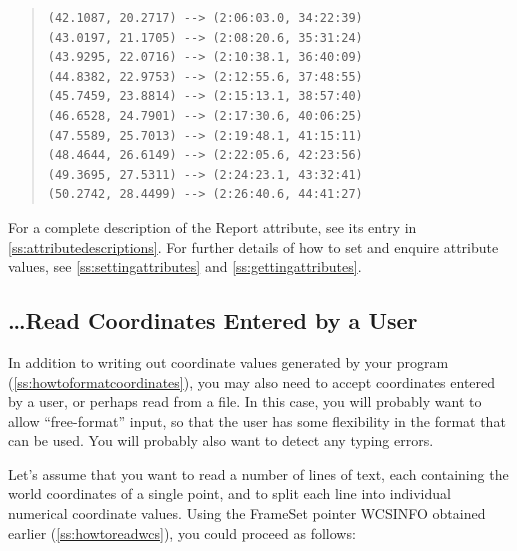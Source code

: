 \documentclass[twoside,11pt]{article}
\newcommand{\htmlref}[2]{#1}
\newcommand{\appref}[1]{Appendix~\ref{#1}}
\newcommand{\secref}[1]{\S\ref{#1}}
\renewcommand{\appref}[1]{\ref{#1}}
\renewcommand{\secref}[1]{\ref{#1}}
\begin{document}
\begin{quote}
\begin{verbatim}
(42.1087, 20.2717) --> (2:06:03.0, 34:22:39)
(43.0197, 21.1705) --> (2:08:20.6, 35:31:24)
(43.9295, 22.0716) --> (2:10:38.1, 36:40:09)
(44.8382, 22.9753) --> (2:12:55.6, 37:48:55)
(45.7459, 23.8814) --> (2:15:13.1, 38:57:40)
(46.6528, 24.7901) --> (2:17:30.6, 40:06:25)
(47.5589, 25.7013) --> (2:19:48.1, 41:15:11)
(48.4644, 26.6149) --> (2:22:05.6, 42:23:56)
(49.3695, 27.5311) --> (2:24:23.1, 43:32:41)
(50.2742, 28.4499) --> (2:26:40.6, 44:41:27)
\end{verbatim}
\end{quote}

For a complete description of the Report attribute, see its entry in
\appref{ss:attributedescriptions}.  For further details of how to set
and enquire attribute values, see \secref{ss:settingattributes} and
\secref{ss:gettingattributes}.

\subsection{\ldots Read Coordinates Entered by a User}

In addition to writing out coordinate values generated by your program
(\secref{ss:howtoformatcoordinates}), you may also need to accept
coordinates entered by a user, or perhaps read from a file. In this
case, you will probably want to allow ``free-format'' input, so that
the user has some flexibility in the format that can be used. You will
probably also want to detect any typing errors.

Let's assume that you want to read a number of lines of text, each
containing the world coordinates of a single point, and to split each
line into individual numerical coordinate values. Using the \htmlref{FrameSet}{FrameSet}
pointer WCSINFO obtained earlier (\secref{ss:howtoreadwcs}), you could
proceed as follows:
\end{document}
